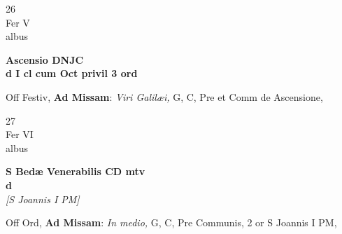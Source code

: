 \documentclass[10pt, openany]{book}
\begin{document}
        \begin{center}
            \begin{minipage}{3.5in}
                \vspace{2em}
                \begin{minipage}{0.5in}
                    {\Huge 26} \\
                    {\normalsize Fer V} \\
                    {\normalsize albus}
                \end{minipage}
                \begin{minipage}{3.0in}
                    \textbf{ \large Ascensio DNJC \\
                    \textnormal{\normalsize d I cl cum Oct privil 3 ord}} \\ 
                \end{minipage}
                \begin{justify}Off Festiv, \textbf{Ad Missam}: \textit{Viri Galilæi,} G, C, Pre et Comm de Ascensione,  
                \end{justify}
            \end{minipage}
        \end{center}
    
        \begin{center}
            \begin{minipage}{3.5in}
                \vspace{2em}
                \begin{minipage}{0.5in}
                    {\Huge 27} \\
                    {\normalsize Fer VI} \\
                    {\normalsize albus}
                \end{minipage}
                \begin{minipage}{3.0in}
                    \textbf{ \large S Bedæ Venerabilis CD mtv \\
                    \textnormal{\normalsize d}} \\ \textit{[S Joannis I PM]} \\ 
                \end{minipage}
                \begin{justify}Off Ord, \textbf{Ad Missam}: \textit{In medio,} G, C, Pre Communis, 2 or S Joannis I PM,  
                \end{justify}
            \end{minipage}
        \end{center}
    
\end{document}
